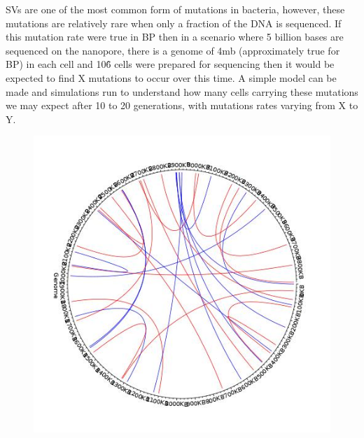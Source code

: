 SVs are one of the most common form of mutations in bacteria, however, these mutations are relatively rare when only a fraction of the DNA is sequenced. If this mutation rate were true in BP then in a scenario where 5 billion bases are sequenced on the nanopore, there is a genome of 4mb (approximately true for BP) in each cell and 10\^6 cells were prepared for sequencing then it would be expected to find X mutations to occur over this time. A simple model can be made and simulations run to understand how many cells carrying these mutations we may expect after 10 to 20 generations, with mutations rates varying from X to Y.




\begin{figure}[h!]
\centering
\includegraphics[width=\textwidth{}]{Chapter_2/UK54_new_basketball.jpeg}
\caption{  }
\label{fig:UK54_new_basket}
\end{figure}

